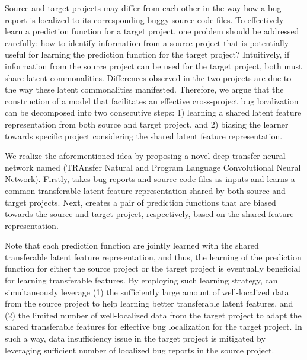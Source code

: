 Source and target projects may differ from each other in the way how a bug report is localized to its corresponding buggy source code files. To effectively learn a prediction function for a target project, one problem should be addressed carefully: how to identify information from a source project that is potentially useful for learning the prediction function for the target project? Intuitively, if information from the source project can be used for the target project, both must share latent commonalities. Differences observed in the two projects are due to the way these latent commonalities manifested. Therefore, we argue that the construction of a model that facilitates an effective cross-project bug localization can be decomposed into two consecutive steps: 1) learning a shared latent feature representation from both source and target project, and 2) biasing the learner towards specific project considering the shared latent feature representation.   %

We realize the aforementioned idea by proposing a novel deep transfer neural network named \TRANPCNN (TRAnsfer Natural and Program Language Convolutional Neural Network). Firstly, \TRANPCNN takes bug reports and source code files as inputs and learns a common transferable latent feature representation shared by both source and target projects. Next, \TRANPCNN  creates a pair of prediction functions that are biased towards the source and target project, respectively, based on the shared feature representation. 

Note that each prediction function are jointly learned with the shared transferable latent feature representation, and thus, the learning of the prediction function for either the source project or the target project is eventually beneficial for learning transferable features.  By employing such learning strategy, \TRANPCNN can simultaneously leverage (1) the sufficiently large amount of well-localized data from the source project to help learning better transferable latent features, and (2) the limited number of well-localized data from the target project to adapt the shared transferable features for effective bug localization for the target project. In such a way,  data insufficiency issue in the target project is mitigated by leveraging sufficient number of localized bug reports in the source project.  %





